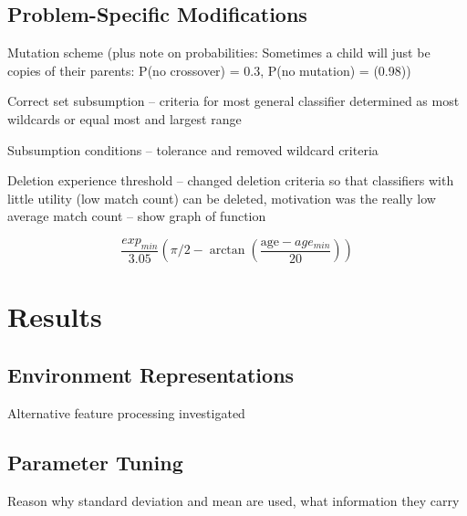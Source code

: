 \documentclass[11pt]{article}
\begin{document}
\begin{multicols}{2}


\subsection{Problem-Specific Modifications}
\label{sec:exp2mods}


Mutation scheme (plus note on probabilities: Sometimes a child will just be copies of their parents: P(no crossover) = 0.3, P(no mutation) = (0.98))

Correct set subsumption -- criteria for most general classifier determined as most wildcards or equal most and largest range

Subsumption conditions -- tolerance and removed wildcard criteria

Deletion experience threshold -- changed deletion criteria so that classifiers with little utility (low match count) can be deleted, motivation was the really low average match count -- show graph of function

{\small \[
\frac{exp_{min}}{3.05}
\left(
\pi/2-\arctan\left(\frac{\textrm{age} - age_{min}}{20} \right) \right)
\]}







\section{Results}





\subsection{Environment Representations}

Alternative feature processing investigated



\subsection{Parameter Tuning}

%
%
%



Reason why standard deviation and mean are used, what information they carry



\end{multicols}
\end{document}
